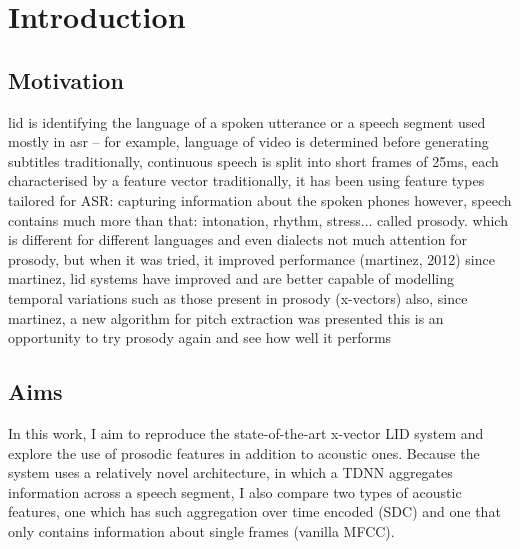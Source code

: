 \documentclass[bsc,frontabs,twoside,singlespacing,parskip,deptreport]{infthesis}
\begin{document}
\chapter{Introduction}{
  \label{chap:Introduction}
  
  \section{Motivation}{
    lid is identifying the language of a spoken utterance or a speech segment
    used mostly in asr -- for example, language of video is determined before generating subtitles
    traditionally, continuous speech is split into short frames of 25ms, each characterised by a feature vector
    traditionally, it has been using feature types tailored for ASR: capturing information about the spoken phones
    however, speech contains much more than that: intonation, rhythm, stress... called prosody. which is different for different languages and even dialects
    not much attention for prosody, but when it was tried, it improved performance (martinez, 2012)
    since martinez, lid systems have improved and are better capable of modelling temporal variations such as those present in prosody (x-vectors)
    also, since martinez, a new algorithm for pitch extraction was presented
    this is an opportunity to try prosody again and see how well it performs
  }
  \section{Aims}{
    In this work, I aim to reproduce the state-of-the-art x-vector LID system and explore the use of prosodic features in addition to acoustic ones. Because the system uses a relatively novel architecture, in which a TDNN aggregates information across a speech segment, I also compare two types of acoustic features, one which has such aggregation over time encoded (SDC) and one that only contains information about single frames (vanilla MFCC).
  }
}
\end{document}
